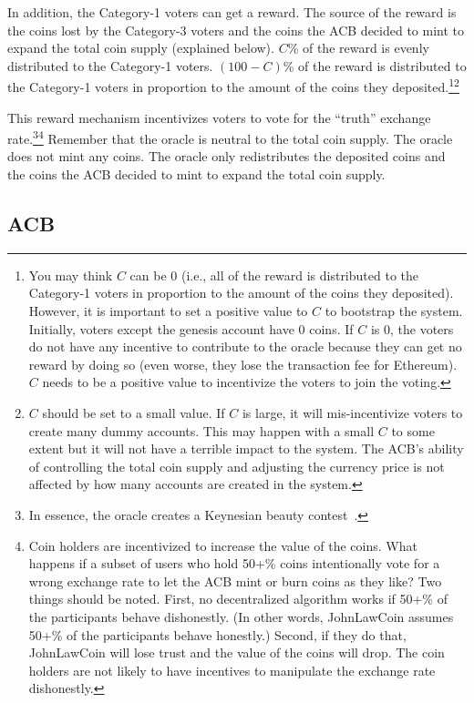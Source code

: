 \documentclass[dvipdfmx,a4paper]{article}
\begin{document}
In addition, the Category-1 voters can get a reward. The source of the reward is the coins lost by the Category-3 voters and the coins the ACB decided to mint to expand the total coin supply (explained below). $C$\% of the reward is evenly distributed to the Category-1 voters. $(100-C)$\% of the reward is distributed to the Category-1 voters in proportion to the amount of the coins they deposited.\footnote{You may think $C$ can be 0 (i.e., all of the reward is distributed to the Category-1 voters in proportion to the amount of the coins they deposited). However, it is important to set a positive value to $C$ to bootstrap the system. Initially, voters except the genesis account have 0 coins. If $C$ is 0, the voters do not have any incentive to contribute to the oracle because they can get no reward by doing so (even worse, they lose the transaction fee for Ethereum). $C$ needs to be a positive value to incentivize the voters to join the voting.}\footnote{$C$ should be set to a small value. If $C$ is large, it will mis-incentivize voters to create many dummy accounts. This may happen with a small $C$ to some extent but it will not have a terrible impact to the system. The ACB's ability of controlling the total coin supply and adjusting the currency price is not affected by how many accounts are created in the system.}

This reward mechanism incentivizes voters to vote for the ``truth'' exchange rate.\footnote{In essence, the oracle creates a Keynesian beauty contest~\cite{gao2008keynesian}.}\footnote{Coin holders are incentivized to increase the value of the coins. What happens if a subset of users who hold 50+\% coins intentionally vote for a wrong exchange rate to let the ACB mint or burn coins as they like? Two things should be noted. First, no decentralized algorithm works if 50+\% of the participants behave dishonestly. (In other words, JohnLawCoin assumes 50+\% of the participants behave honestly.) Second, if they do that, JohnLawCoin will lose trust and the value of the coins will drop. The coin holders are not likely to have incentives to manipulate the exchange rate dishonestly.} Remember that the oracle is neutral to the total coin supply. The oracle does not mint any coins. The oracle only redistributes the deposited coins and the coins the ACB decided to mint to expand the total coin supply.

\subsection{ACB}
\end{document}
